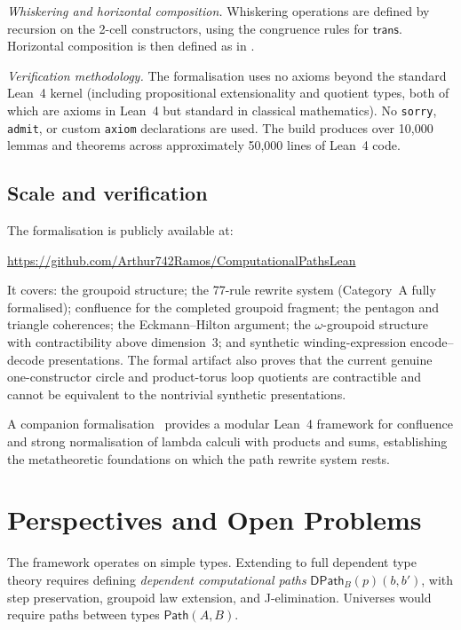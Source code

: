 \documentclass[manuscript]{BSLstyle}
\newcommand{\Path}{\mathsf{Path}}
\newcommand{\trans}{\mathsf{trans}}
\begin{document}
\emph{Whiskering and horizontal composition.}
Whiskering operations are defined by recursion on the 2-cell constructors,
using the congruence rules for $\trans$.  Horizontal composition is then
defined as in .

\emph{Verification methodology.}
The formalisation uses no axioms beyond the standard Lean~4 kernel
(including propositional extensionality and quotient types, both of
which are axioms in Lean~4 but standard in classical mathematics).
No \texttt{sorry}, \texttt{admit}, or custom \texttt{axiom} declarations
are used.  The build produces over 10{,}000 lemmas and theorems across
approximately 50{,}000 lines of Lean~4 code.

\subsection{Scale and verification}

The formalisation is publicly available at:
\begin{center}
\url{https://github.com/Arthur742Ramos/ComputationalPathsLean}
\end{center}

\noindent
It covers: the groupoid structure; the 77-rule rewrite system (Category~A
fully formalised); confluence for the completed groupoid fragment; the
pentagon and triangle coherences; the Eckmann--Hilton argument; the
$\omega$-groupoid structure with contractibility above dimension~3;
and synthetic winding-expression encode--decode presentations.  The formal
artifact also proves that the current genuine one-constructor circle and
product-torus loop quotients are contractible and cannot be equivalent to the
nontrivial synthetic presentations.

A companion formalisation~\cite{RamosDeOliveiraDeQueirozDeVeras2025lean4}
provides a modular Lean~4 framework for confluence and strong normalisation
of lambda calculi with products and sums, establishing the metatheoretic
foundations on which the path rewrite system rests.

\section{Perspectives and Open Problems}\label{sec:perspectives}

\begin{problem}
\label{prob:dependent}
The framework operates on simple types.  Extending to full dependent type
theory requires defining \emph{dependent computational paths}
$\mathsf{DPath}_B(p)(b, b')$, with step preservation, groupoid law
extension, and J-elimination.  Universes would require paths between
types $\Path(A, B)$.
\end{problem}
\end{document}
